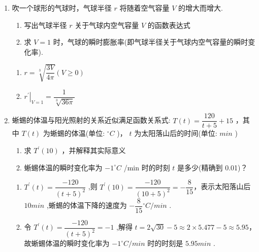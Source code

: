 \begin{enumerate}
    \item 吹一个球形的气球时，气球半径 ${r}$ 将随着空气容量 ${V}$ 的增大而增大.
    \begin{enumerate}
        \item 写出气球半径 ${r}$ 关于气球内空气容量 ${V}$ 的函数表达式
        \item 求 ${V} = 1$ 时，气球的瞬时膨胀率(即气球半径关于气球内空气容量的瞬时变化率).
    \end{enumerate}
    \begin{jieda}
        \begin{enumerate}
            \item $r = \sqrt[3]{\dfrac{3V}{4\pi }}\left( {V \geq  0}\right)$
            \item ${\left. {r}^{\prime }\right| }_{V = 1} = \dfrac{1}{\sqrt[3]{36\pi }}$
        \end{enumerate}
    \end{jieda}
    
    \item 蜥蜴的体温与阳光照射的关系近似满足函数关系式: $T\left( t\right)  = \dfrac{120}{t + 5} + {15}$ ，其中 $T\left( t\right)$ 为蜥蜴的体温(单位: ${}^{ \circ  }{C}$ )， $t$ 为太阳落山后的时间(单位: ${{min}}$ )
    \begin{enumerate}
        \item 求 ${T}^{\prime }\left( {10}\right)$ ，并解释其实际意义
        \item 蜥蜴体温的瞬时变化率为 $- {1}^{ \circ  }{C}$ /min 时的时刻 $t$ 是多少(精确到 0.01)？
    \end{enumerate}
    \begin{jieda}
        \begin{enumerate}
            \item ${T}^{\prime }\left( t\right)  = \dfrac{-{120}}{{\left( t + 5\right) }^{2}}$ ,则 ${T}^{\prime }\left( {10}\right)  = \dfrac{-{120}}{{\left( {10} + 5\right) }^{2}} =  - \dfrac{8}{15}$，表示太阳落山后 ${10}{{min}}$ ,蜥蜴的体温下降的速度为 $- \dfrac{8}{15}{}^{ \circ  }{C}/{{min}}$ .
            
            \item 令 ${T}^{\prime }\left( t\right)  = \dfrac{-{120}}{{\left( t + 5\right) }^{2}} =  - 1$ ,解得 $t = 2\sqrt{30} - 5 \approx  2 \times  {5.477} - 5 \approx  {5.95}$，故蜥蜴体温的瞬时变化率为 $- {1}^{ \circ  }{C}/{{min}}$ 时的时刻是 ${5.95}{{min}}$ .
        \end{enumerate}
    \end{jieda}
\end{enumerate}

